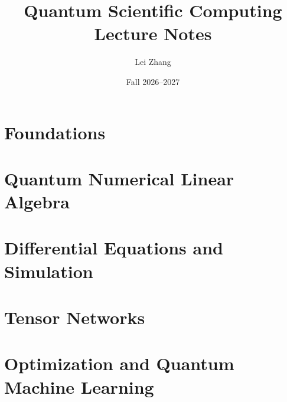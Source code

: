 \documentclass[11pt,openany]{book}
\title{\textbf{Quantum Scientific Computing}\\[0.5em]
       \large Lecture Notes}
\author{%
        Lei Zhang}
\date{Fall 2026--2027}
\begin{document}
\frontmatter
\maketitle

\tableofcontents

\mainmatter

\part{Foundations}






\part{Quantum Numerical Linear Algebra}






\part{Differential Equations and Simulation}





\part{Tensor Networks}




\part{Optimization and Quantum Machine Learning}



\end{document}
